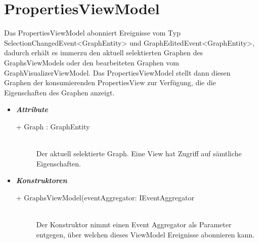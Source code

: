 \documentclass[13pt]{scrreprt}
\begin{document}
	\section{PropertiesViewModel}
	Das PropertiesViewModel abonniert Ereignisse vom Typ SelectionChangedEvent<GraphEntity> und GraphEditedEvent<GraphEntity>, dadurch erh\"alt es immerzu den aktuell selektierten Graphen des GraphsViewModels oder den bearbeiteten Graphen vom GraphVisualizerViewModel. Das PropertiesViewModel stellt dann diesen Graphen der konsumierenden PropertiesView zur Verf\"ugung, die die Eigenschaften des Graphen anzeigt.
	\begin{itemize}[label = {$\circ$}]
		\item {\large \textbf{\textit{Attribute}}\par}
		\begin{description}
			\item [+ Graph : GraphEntity] \hfill \\Der aktuell selektierte Graph. Eine View hat Zugriff auf s\"amtliche Eigenschaften.
		\end{description}
		\item {\large \textbf{\textit{Konstruktoren}}\par}
		\begin{description}
			\item [+ GraphsViewModel(eventAggregator: IEventAggregator] \hfill \\ Der Konstruktor nimmt einen Event Aggregator als Parameter entgegen, über welchen dieses ViewModel Ereignisse abonnieren kann.
		\end{description}
	\end{itemize}
	
\end{document}
